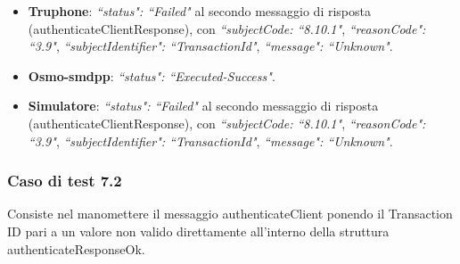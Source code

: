 \documentclass[10pt, oneside]{book}
\begin{document}
\begin{itemize}
\item \textbf{Truphone}: \textit{``status": ``Failed"} al secondo messaggio di risposta (authenticateClientResponse), con \textit{``subjectCode: ``8.10.1"}, \textit{``reasonCode": ``3.9"}, \textit{``subjectIdentifier": ``TransactionId"}, \textit{``message": ``Unknown"}.
\item \textbf{Osmo-smdpp}: \textit{``status": ``Executed-Success"}.
\item \textbf{Simulatore}: \textit{``status": ``Failed"} al secondo messaggio di risposta (authenticateClientResponse), con \textit{``subjectCode: ``8.10.1"}, \textit{``reasonCode": ``3.9"}, \textit{``subjectIdentifier": ``TransactionId"}, \textit{``message": ``Unknown"}.
\end{itemize}

\subsubsection{Caso di test 7.2}
Consiste nel manomettere il messaggio authenticateClient ponendo il Transaction ID pari a un valore non valido direttamente all'interno della struttura authenticateResponseOk.
\end{document}
